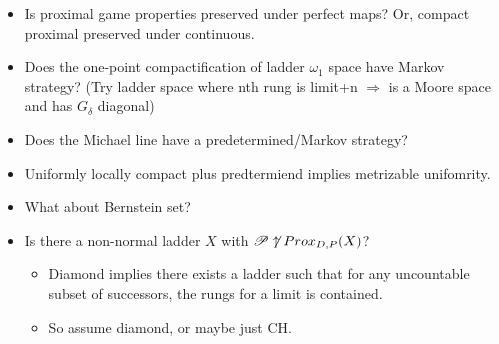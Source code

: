 \begin{itemize}
\begin{itemize}
        \item Is proximal game properties preserved under perfect maps? Or, compact proximal preserved under continuous.
        \item Does the one-point compactification of ladder $\omega_1$ space have Markov strategy? (Try ladder space where
              nth rung is limit+n $\Rightarrow$ is a Moore space and has $G_\delta$ diagonal)
        \item Does the Michael line have a predetermined/Markov strategy?
        \item Uniformly locally compact plus predtermiend implies metrizable unifomrity.
        \item What about Bernstein set?
        \item Is there a non-normal ladder $X$ with $\mathscr{P}\not\uparrow Prox_{D,P}(X)$?
          \begin{itemize}
            \item Diamond implies there exists a ladder such that for any
                  uncountable subset of successors, the rungs for a limit is
                  contained.
            \item So assume diamond, or maybe just CH.
          \end{itemize}
      \end{itemize}
  \end{itemize}
